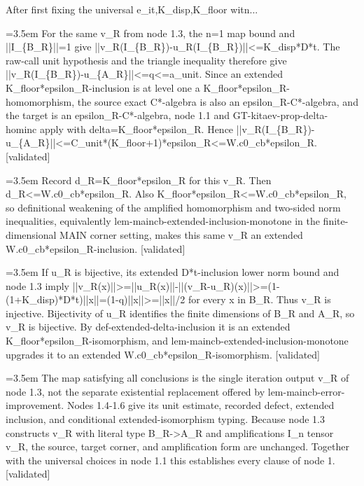 \documentclass{article}
\newcommand{\step}[1]{\par\noindent\hangindent=3.5em\hangafter=1%
  \makebox[3.5em][l]{\textbf{#1.}}}
\newcommand{\steptag}[1]{\hfill{\small\textsf{[#1]}}}
\begin{document}
\begin{proofbox}{After first fixing the universal e\_it,K\_disp,K\_floor witn...}
\step{1.4} For the same v\_R from node 1.3, the n=1 map bound and ||I\_\{B\_R\}||=1 give ||v\_R(I\_\{B\_R\})-u\_R(I\_\{B\_R\})||<=K\_disp*D*t. The raw-call unit hypothesis and the triangle inequality therefore give ||v\_R(I\_\{B\_R\})-u\_\{A\_R\}||<=q<=a\_unit. Since an extended K\_floor*epsilon\_R-inclusion is at level one a K\_floor*epsilon\_R-homomorphism, the source exact C*-algebra is also an epsilon\_R-C*-algebra, and the target is an epsilon\_R-C*-algebra, node 1.1 and GT-kitaev-prop-delta-hominc apply with delta=K\_floor*epsilon\_R. Hence ||v\_R(I\_\{B\_R\})-u\_\{A\_R\}||<=C\_unit*(K\_floor+1)*epsilon\_R<=W.c0\_cb*epsilon\_R. \steptag{validated} \\[4pt]
\step{1.5} Record d\_R=K\_floor*epsilon\_R for this v\_R. Then d\_R<=W.c0\_cb*epsilon\_R. Also K\_floor*epsilon\_R<=W.c0\_cb*epsilon\_R, so definitional weakening of the amplified homomorphism and two-sided norm inequalities, equivalently lem-maincb-extended-inclusion-monotone in the finite-dimensional MAIN corner setting, makes this same v\_R an extended W.c0\_cb*epsilon\_R-inclusion. \steptag{validated} \\[4pt]
\step{1.6} If u\_R is bijective, its extended D*t-inclusion lower norm bound and node 1.3 imply ||v\_R(x)||>=||u\_R(x)||-||(v\_R-u\_R)(x)||>=(1-(1+K\_disp)*D*t)||x||=(1-q)||x||>=||x||/2 for every x in B\_R. Thus v\_R is injective. Bijectivity of u\_R identifies the finite dimensions of B\_R and A\_R, so v\_R is bijective. By def-extended-delta-inclusion it is an extended K\_floor*epsilon\_R-isomorphism, and lem-maincb-extended-inclusion-monotone upgrades it to an extended W.c0\_cb*epsilon\_R-isomorphism. \steptag{validated} \\[4pt]
\step{1.7} The map satisfying all conclusions is the single iteration output v\_R of node 1.3, not the separate existential replacement offered by lem-maincb-error-improvement. Nodes 1.4-1.6 give its unit estimate, recorded defect, extended inclusion, and conditional extended-isomorphism typing. Because node 1.3 constructs v\_R with literal type B\_R->A\_R and amplifications I\_n tensor v\_R, the source, target corner, and amplification form are unchanged. Together with the universal choices in node 1.1 this establishes every clause of node 1. \steptag{validated} \\[4pt]
\end{proofbox}
\end{document}
